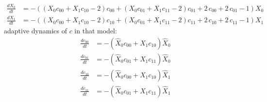 \documentclass{article}
\begin{document}
\[\begin{align*}
\frac{dX_{0}}{dt} &= -{\left({\left(X_{0} c_{00} + X_{1} c_{10} - 2\right)} c_{00} + {\left(X_{0} c_{01} + X_{1} c_{11} - 2\right)} c_{01} + 2 \, c_{00} + 2 \, c_{01} - 1\right)} X_{0}\\
\frac{dX_{1}}{dt} &= -{\left({\left(X_{0} c_{00} + X_{1} c_{10} - 2\right)} c_{10} + {\left(X_{0} c_{01} + X_{1} c_{11} - 2\right)} c_{11} + 2 \, c_{10} + 2 \, c_{11} - 1\right)} X_{1}
\end{align*} \
\]
adaptive dynamics of $c$ in that model:
\[\begin{align*}
\frac{dc_{00}}{dt} &= -{\left(\hat{X}_{0} c_{00} + \hat{X}_{1} c_{10}\right)} \hat{X}_{0}\\
\frac{dc_{01}}{dt} &= -{\left(\hat{X}_{0} c_{01} + \hat{X}_{1} c_{11}\right)} \hat{X}_{0}\\
\frac{dc_{10}}{dt} &= -{\left(\hat{X}_{0} c_{00} + \hat{X}_{1} c_{10}\right)} \hat{X}_{1}\\
\frac{dc_{11}}{dt} &= -{\left(\hat{X}_{0} c_{01} + \hat{X}_{1} c_{11}\right)} \hat{X}_{1}
\end{align*} \
\]
\end{document}

